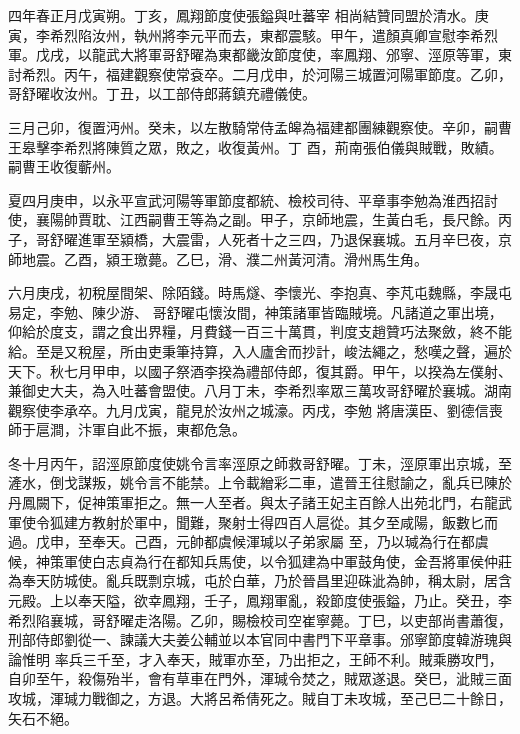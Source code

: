 \begin{pinyinscope}
 四年春正月戊寅朔。丁亥，鳳翔節度使張鎰與吐蕃宰
 相尚結贊同盟於清水。庚寅，李希烈陷汝州，執州將李元平而去，東都震駭。甲午，遣顏真卿宣慰李希烈軍。戊戌，以龍武大將軍哥舒曜為東都畿汝節度使，率鳳翔、邠寧、涇原等軍，東討希烈。丙午，福建觀察使常袞卒。二月戊申，於河陽三城置河陽軍節度。乙卯，哥舒曜收汝州。丁丑，以工部侍郎蔣鎮充禮儀使。



 三月己卯，復置沔州。癸未，以左散騎常侍孟皞為福建都團練觀察使。辛卯，嗣曹王皋擊李希烈將陳質之眾，敗之，收復黃州。丁
 酉，荊南張伯儀與賊戰，敗績。嗣曹王收復蘄州。



 夏四月庚申，以永平宣武河陽等軍節度都統、檢校司待、平章事李勉為淮西招討使，襄陽帥賈耽、江西嗣曹王等為之副。甲子，京師地震，生黃白毛，長尺餘。丙子，哥舒曜進軍至潁橋，大震雷，人死者十之三四，乃退保襄城。五月辛巳夜，京師地震。乙酉，潁王璬薨。乙巳，滑、濮二州黃河清。滑州馬生角。



 六月庚戌，初稅屋間架、除陌錢。時馬燧、李懷光、李抱真、李芃屯魏縣，李晟屯易定，李勉、陳少游、
 哥舒曜屯懷汝間，神策諸軍皆臨賊境。凡諸道之軍出境，仰給於度支，謂之食出界糧，月費錢一百三十萬貫，判度支趙贊巧法聚斂，終不能給。至是又稅屋，所由吏秉筆持算，入人廬舍而抄計，峻法繩之，愁嘆之聲，遍於天下。秋七月甲申，以國子祭酒李揆為禮部侍郎，復其爵。甲午，以揆為左僕射、兼御史大夫，為入吐蕃會盟使。八月丁未，李希烈率眾三萬攻哥舒曜於襄城。湖南觀察使李承卒。九月戊寅，龍見於汝州之城濠。丙戌，李勉
 將唐漢臣、劉德信喪師于扈澗，汴軍自此不振，東都危急。



 冬十月丙午，詔涇原節度使姚令言率涇原之師救哥舒曜。丁未，涇原軍出京城，至滻水，倒戈謀叛，姚令言不能禁。上令載繒彩二車，遣晉王往慰諭之，亂兵已陳於丹鳳闕下，促神策軍拒之。無一人至者。與太子諸王妃主百餘人出苑北門，右龍武軍使令狐建方教射於軍中，聞難，聚射士得四百人扈從。其夕至咸陽，飯數匕而過。戊申，至奉天。己酉，元帥都虞候渾瑊以子弟家屬
 至，乃以瑊為行在都虞候，神策軍使白志貞為行在都知兵馬使，以令狐建為中軍鼓角使，金吾將軍侯仲莊為奉天防城使。亂兵既剽京城，屯於白華，乃於晉昌里迎硃泚為帥，稱太尉，居含元殿。上以奉天隘，欲幸鳳翔，壬子，鳳翔軍亂，殺節度使張鎰，乃止。癸丑，李希烈陷襄城，哥舒曜走洛陽。乙卯，賜檢校司空崔寧薨。丁巳，以吏部尚書蕭復，刑部侍郎劉從一、諫議大夫姜公輔並以本官同中書門下平章事。邠寧節度韓游瑰與論惟明
 率兵三千至，才入奉天，賊軍亦至，乃出拒之，王師不利。賊乘勝攻門，自卯至午，殺傷殆半，會有草車在門外，渾瑊令焚之，賊眾遂退。癸巳，泚賊三面攻城，渾瑊力戰御之，方退。大將呂希倩死之。賊自丁未攻城，至己巳二十餘日，矢石不絕。




\end{pinyinscope}
